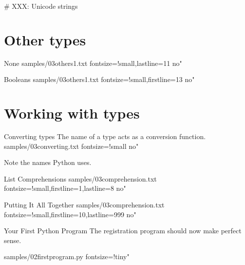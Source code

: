 \documentclass{pyslides}
\begin{document}
# XXX: Unicode strings

\section{Other types}

\begin{frame}[fragile]{None}
 samples/03others1.txt fontsize=!small,lastline=11 no"
\end{frame}

\begin{frame}[fragile]{Booleans}
 samples/03others1.txt fontsize=!small,firstline=13 no"
\end{frame}

\section{Working with types}

\begin{frame}[fragile]{Converting types}
The name of a type acts as a conversion function.
 samples/03converting.txt fontsize=!small no"

\bigskip

Note the names Python uses.
\end{frame}

\begin{frame}[fragile]{List Comprehensions}
 samples/03comprehension.txt fontsize=!small,firstline=1,lastline=8 no"
\end{frame}

\begin{frame}[fragile]{Putting It All Together}
 samples/03comprehension.txt fontsize=!small,firstline=10,lastline=999 no"
\end{frame}

\begin{frame}[fragile]{Your First Python Program}
The registration program should now make perfect sense.

\bigskip

 samples/02firstprogram.py fontsize=!tiny"

\bigskip
\end{frame}
\end{document}
